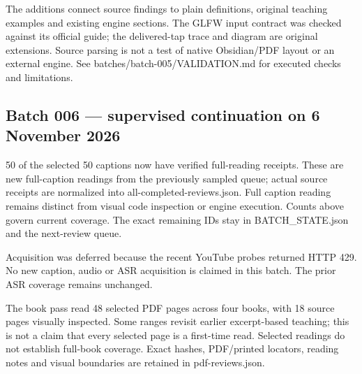 The additions connect source findings to plain definitions, original teaching examples and existing engine sections. The GLFW input contract was checked against its official guide; the delivered-tap trace and diagram are original extensions. Source parsing is not a test of native Obsidian/PDF layout or an external engine. See batches/batch-005/VALIDATION.md for executed checks and limitations.

\subsection{Batch 006 --- supervised continuation on 6 November 2026}\label{appendix-877738f6f4d2-batch-006-supervised-continuation-on-6-november-2026}

\hypertarget{appendix-877738f6f4d2-batch-006-supervised-continuation-on-6-november-2026}{}

50 of the selected 50 captions now have verified full-reading receipts. These are new full-caption readings from the previously sampled queue; actual source receipts are normalized into all-completed-reviews.json. Full caption reading remains distinct from visual code inspection or engine execution. Counts above govern current coverage. The exact remaining IDs stay in BATCH\_STATE.json and the next-review queue.

Acquisition was deferred because the recent YouTube probes returned HTTP 429. No new caption, audio or ASR acquisition is claimed in this batch. The prior ASR coverage remains unchanged.

The book pass read 48 selected PDF pages across four books, with 18 source pages visually inspected. Some ranges revisit earlier excerpt-based teaching; this is not a claim that every selected page is a first-time read. Selected readings do not establish full-book coverage. Exact hashes, PDF/printed locators, reading notes and visual boundaries are retained in pdf-reviews.json.

